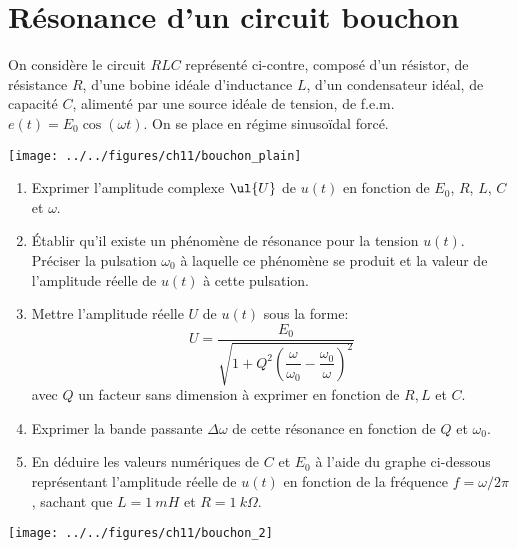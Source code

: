 \documentclass[a4paper, 11pt]{book}
\begin{document}
\resetQ
\section{Résonance d'un circuit bouchon}

\begin{minipage}{0.55\linewidth}
    
On considère le circuit $RLC$ représenté ci-contre, composé d'un
résistor, de résistance $R$, d'une bobine idéale d'inductance $L$,
d'un condensateur idéal, de capacité $C$, alimenté par une source
idéale de tension, de f.e.m. $e(t)=E_0\cos(\omega t)$. On se place en
régime sinusoïdal forcé.
\end{minipage}
\hfill
\begin{minipage}{0.45\linewidth}
    \begin{center}
        \texttt{[image: ../../figures/ch11/bouchon\_plain]}
    \end{center}
\end{minipage}

\begin{enumerate}
    \item Exprimer l'amplitude complexe $\ul{U}$ de $u(t)$ en
        fonction de $E_0$, $R$, $L$, $C$ et $\omega$.
    \item Établir qu'il existe un phénomène de résonance pour la tension
        $u(t)$. Préciser la pulsation $\omega_0$ à laquelle ce phénomène se
        produit et la valeur de l'amplitude réelle de $u(t)$ à cette
        pulsation.
    \item Mettre l'amplitude réelle $U$ de $u(t)$ sous la forme: \[U =
            \dfrac{E_0}{\sqrt{1 + Q^2\left(\dfrac{\omega}{\omega_0} -
        \dfrac{\omega_0}{\omega}\right)^2}}\] avec $Q$ un facteur sans
        dimension à exprimer en fonction de $R,L$ et $C$.
    \item Exprimer la bande passante $\Delta\omega$ de cette résonance en
        fonction de $Q$ et $\omega_0$.
    \item En déduire les valeurs numériques de $C$ et $E_0$ à l'aide du
        graphe ci-dessous représentant l'amplitude réelle de $u(t)$ en
        fonction de la fréquence $f=\omega/2\pi$, sachant que $L= \SI{1}{mH}$ et
        $R= \SI{1}{k\Omega}$.
\end{enumerate}

\begin{center}
    \texttt{[image: ../../figures/ch11/bouchon\_2]}
\end{center}
\end{document}
